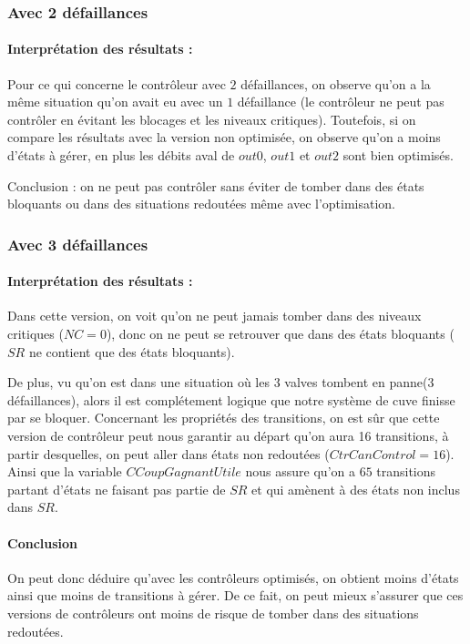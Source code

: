 \documentclass[a4paper]{book}
\begin{document}
\subsubsection{Avec 2 défaillances}

\paragraph{Interprétation des résultats :}
Pour ce qui concerne le contrôleur avec $2$ défaillances, on observe qu'on a la même situation qu'on avait eu avec un $1$ défaillance (le contrôleur ne peut pas contrôler en évitant les blocages et les niveaux critiques).
Toutefois, si on compare les résultats avec la version non optimisée, on observe qu'on a moins d'états à gérer, en plus les débits aval de $out0$, $out1$ et $out2$ sont bien optimisés.

Conclusion : on ne peut pas contrôler sans éviter de tomber dans des états bloquants ou dans des situations redoutées même avec l'optimisation.

\subsubsection{Avec 3 défaillances}

\paragraph{Interprétation des résultats : }
Dans cette version, on voit qu'on ne peut jamais tomber dans des niveaux critiques ($NC=0$), donc on ne peut se retrouver que dans des états bloquants ($SR$ ne contient que des états bloquants).

De plus, vu qu'on est dans une situation où les 3 valves tombent en panne(3 défaillances), alors il est complétement logique que notre système de cuve finisse par se bloquer.
Concernant les propriétés des transitions, on est sûr que cette version de contrôleur peut nous garantir au départ qu'on aura 16 transitions, à partir desquelles, on peut aller dans états non redoutées ($CtrCanControl = 16$).
Ainsi que la variable $CCoupGagnantUtile$ nous assure qu'on a $65$ transitions partant d'états ne faisant pas partie de $SR$ et qui amènent à des états non inclus dans $SR$.
\paragraph{Conclusion}
On peut donc déduire qu'avec les contrôleurs optimisés, on obtient moins d'états ainsi que moins de transitions à gérer.
De ce fait, on peut mieux s'assurer que ces versions de contrôleurs ont moins de risque de tomber dans des situations redoutées.
\end{document}
